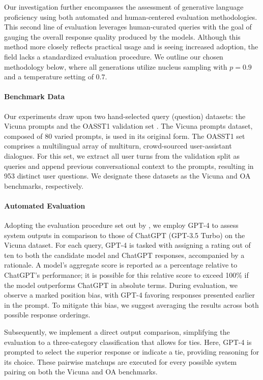 Our investigation further encompasses the assessment of generative language proficiency using both automated and human-centered evaluation methodologies. This second line of evaluation leverages human-curated queries with the goal of gauging the overall response quality produced by the models. Although this method more closely reflects practical usage and is seeing increased adoption, the field lacks a standardized evaluation procedure. We outline our chosen methodology below, where all generations utilize nucleus sampling with $p=0.9$ and a temperature setting of $0.7$.

\paragraph{Benchmark Data} Our experiments draw upon two hand-selected query (question) datasets: the Vicuna prompts \citep{vicuna2023} and the OASST1 validation set \citep{kopf2023openassistant}. The Vicuna prompts dataset, composed of 80 varied prompts, is used in its original form. The OASST1 set comprises a multilingual array of multiturn, crowd-sourced user-assistant dialogues. For this set, we extract all user turns from the validation split as queries and append previous conversational context to the prompts, resulting in 953 distinct user questions. We designate these datasets as the Vicuna and OA benchmarks, respectively.

\paragraph{Automated Evaluation} Adopting the evaluation procedure set out by \citet{vicuna2023}, we employ GPT-4 to assess system outputs in comparison to those of ChatGPT (GPT-3.5 Turbo) on the Vicuna dataset. For each query, GPT-4 is tasked with assigning a rating out of ten to both the candidate model and ChatGPT responses, accompanied by a rationale. A model’s aggregate score is reported as a percentage relative to ChatGPT's performance; it is possible for this relative score to exceed 100\% if the model outperforms ChatGPT in absolute terms. During evaluation, we observe a marked position bias, with GPT-4 favoring responses presented earlier in the prompt. To mitigate this bias, we suggest averaging the results across both possible response orderings.

Subsequently, we implement a direct output comparison, simplifying the evaluation to a three-category classification that allows for ties. Here, GPT-4 is prompted to select the superior response or indicate a tie, providing reasoning for its choice. These pairwise matchups are executed for every possible system pairing on both the Vicuna and OA benchmarks.

